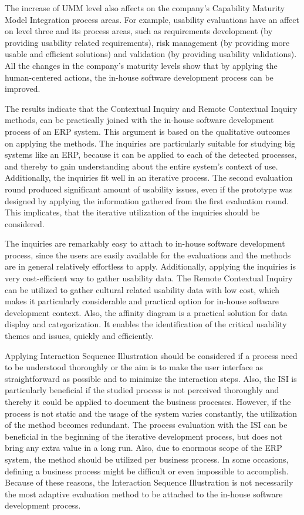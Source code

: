 \documentclass[12pt,a4paper,oneside,pdftex]{report}
\begin{document}
The increase of UMM level also affects on the company's Capability Maturity Model Integration process areas. For example, usability evaluations have an affect on level three and its process areas, such as requirements development (by providing usability related requirements), risk management (by providing more usable and efficient solutions) and validation (by providing usability validations). All the changes in the company's maturity levels show that by applying the human-centered actions, the in-house software development process can be improved.

The results indicate that the Contextual Inquiry and Remote Contextual Inquiry methods, can be practically joined with the in-house software development process of an ERP system. This argument is based on the qualitative outcomes on applying the methods. The inquiries are particularly suitable for studying big systems like an ERP, because it can be applied to each of the detected processes, and thereby to gain understanding about the entire system's context of use. Additionally, the inquiries fit well in an iterative process. The second evaluation round produced significant amount of usability issues, even if the prototype was designed by applying the information gathered from the first evaluation round. This implicates, that the iterative utilization of the inquiries should be considered. 

The inquiries are remarkably easy to attach to in-house software development process, since the users are easily available for the evaluations and the methods are in general relatively effortless to apply. Additionally, applying the inquiries is very cost-efficient way to gather usability data. The Remote Contextual Inquiry can be utilized to gather cultural related usability data with low cost, which makes it particularly considerable and practical option for in-house software development context. Also, the affinity diagram is a practical solution for data display and categorization. It enables the identification of the critical usability themes and issues, quickly and efficiently.   

Applying Interaction Sequence Illustration should be considered if a process need to be understood thoroughly or the aim is to make the user interface as straightforward as possible and to minimize the interaction steps. Also, the ISI is particularly beneficial if the studied process is not perceived thoroughly and thereby it could be applied to document the business processes. However, if the process is not static and the usage of the system varies constantly, the utilization of the method becomes redundant. The process evaluation with the ISI can be beneficial in the beginning of the iterative development process, but does not bring any extra value in a long run. Also, due to enormous scope of the ERP system, the method should be utilized per business process. In some occasions, defining a business process might be difficult or even impossible to accomplish. Because of these reasons, the Interaction Sequence Illustration is not necessarily the most adaptive evaluation method to be attached to the in-house software development process.
\end{document}
